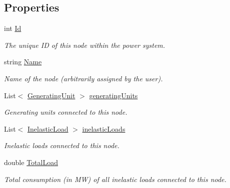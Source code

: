 \subsection*{Properties}
\begin{DoxyCompactItemize}
\item 
int \hyperlink{class_power_system_planning_1_1_node_abd72649e4b2b83daa0980ab87a90034a}{Id}
\begin{DoxyCompactList}\small\item\em The unique ID of this node within the power system. \end{DoxyCompactList}\item 
string \hyperlink{class_power_system_planning_1_1_node_ac793185992fc6c55ca5e1880f4947e57}{Name}
\begin{DoxyCompactList}\small\item\em Name of the node (arbitrarily assigned by the user). \end{DoxyCompactList}\item 
List$<$ \hyperlink{class_power_system_planning_1_1_generating_unit}{Generating\+Unit} $>$ \hyperlink{class_power_system_planning_1_1_node_a8b0943967935c496d57afbd76b12706c}{generating\+Units}
\begin{DoxyCompactList}\small\item\em Generating units connected to this node. \end{DoxyCompactList}\item 
List$<$ \hyperlink{class_power_system_planning_1_1_inelastic_load}{Inelastic\+Load} $>$ \hyperlink{class_power_system_planning_1_1_node_a4cc33a77151060a8eb42d879017733da}{inelastic\+Loads}
\begin{DoxyCompactList}\small\item\em Inelastic loads connected to this node. \end{DoxyCompactList}\item 
double \hyperlink{class_power_system_planning_1_1_node_a5ad80ac9ed391e904c9cf4011c7ba00d}{Total\+Load}
\begin{DoxyCompactList}\small\item\em Total consumption (in MW) of all inelastic loads connected to this node. \end{DoxyCompactList}\item 

\end{DoxyCompactItemize}
